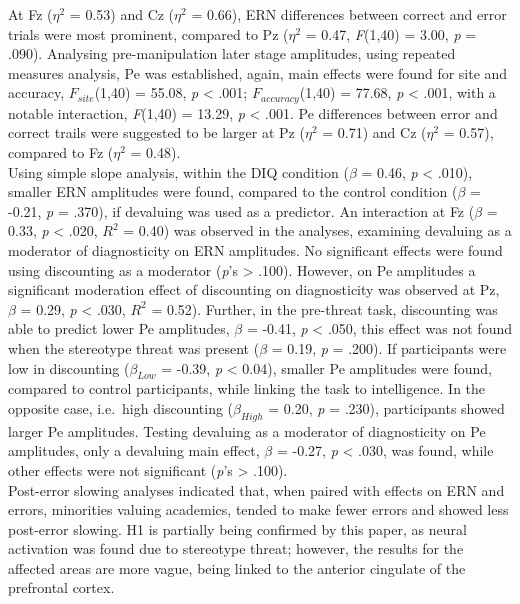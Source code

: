 \documentclass[
  stu,floatsintext]{apa7}
\begin{document}
At Fz (\(\eta^{2}\) = 0.53) and Cz (\(\eta^{2}\) = 0.66), ERN differences between correct and error trials were most prominent, compared to Pz (\(\eta^{2}\) = 0.47, \emph{F}(1,40) = 3.00, \emph{p} = .090).
Analysing pre-manipulation later stage amplitudes, using repeated measures analysis, Pe was established, again, main effects were found for site and accuracy, \(F_{site}\)(1,40) = 55.08, \emph{p} \textless{} .001; \(F_{accuracy}\)(1,40) = 77.68, \emph{p} \textless{} .001, with a notable interaction, \emph{F}(1,40) = 13.29, \emph{p} \textless{} .001.
Pe differences between error and correct trails were suggested to be larger at Pz (\(\eta^{2}\) = 0.71) and Cz (\(\eta^{2}\) = 0.57), compared to Fz (\(\eta^{2}\) = 0.48).\\
Using simple slope analysis, within the DIQ condition (\(\beta\) = 0.46, \emph{p} \textless{} .010), smaller ERN amplitudes were found, compared to the control condition (\(\beta\) = -0.21, \emph{p} = .370), if devaluing was used as a predictor.
An interaction at Fz (\(\beta\) = 0.33, \emph{p} \textless{} .020, \(R^2\) = 0.40) was observed in the analyses, examining devaluing as a moderator of diagnosticity on ERN amplitudes.
No significant effects were found using discounting as a moderator (\emph{p}'s \textgreater{} .100).
However, on Pe amplitudes a significant moderation effect of discounting on diagnosticity was observed at Pz, \(\beta\) = 0.29, \emph{p} \textless{} .030, \(R^2\) = 0.52).
Further, in the pre-threat task, discounting was able to predict lower Pe amplitudes, \(\beta\) = -0.41, \emph{p} \textless{} .050, this effect was not found when the stereotype threat was present (\(\beta\) = 0.19, \emph{p} = .200).
If participants were low in discounting (\(\beta_{Low}\) = -0.39, \emph{p} \textless{} 0.04), smaller Pe amplitudes were found, compared to control participants, while linking the task to intelligence.
In the opposite case, i.e.~high discounting (\(\beta_{High}\) = 0.20, \emph{p} = .230), participants showed larger Pe amplitudes.
Testing devaluing as a moderator of diagnosticity on Pe amplitudes, only a devaluing main effect, \(\beta\) = -0.27, \emph{p} \textless{} .030, was found, while other effects were not significant (\emph{p}'s \textgreater{} .100).\\
Post-error slowing analyses indicated that, when paired with effects on ERN and errors, minorities valuing academics, tended to make fewer errors and showed less post-error slowing.
H1 is partially being confirmed by this paper, as neural activation was found due to stereotype threat; however, the results for the affected areas are more vague, being linked to the anterior cingulate of the prefrontal cortex.
\end{document}
